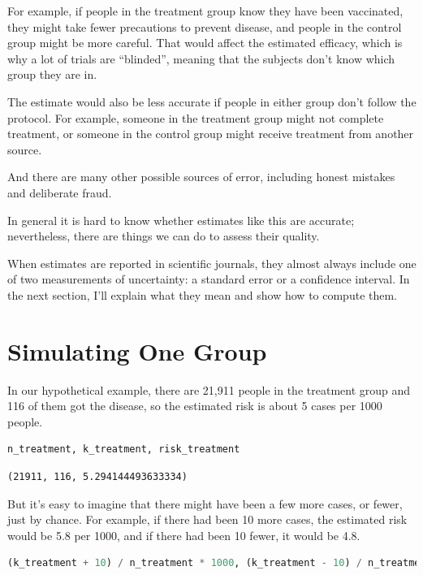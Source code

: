 For example, if people in the treatment group know they have been
vaccinated, they might take fewer precautions to prevent disease, and
people in the control group might be more careful. That would affect the
estimated efficacy, which is why a lot of trials are ``blinded'',
meaning that the subjects don't know which group they are in.

The estimate would also be less accurate if people in either group don't
follow the protocol. For example, someone in the treatment group might
not complete treatment, or someone in the control group might receive
treatment from another source.

And there are many other possible sources of error, including honest
mistakes and deliberate fraud.

In general it is hard to know whether estimates like this are accurate;
nevertheless, there are things we can do to assess their quality.

When estimates are reported in scientific journals, they almost always
include one of two measurements of uncertainty: a standard error or a
confidence interval. In the next section, I'll explain what they mean
and show how to compute them.

\hypertarget{simulating-one-group}{%
\section{Simulating One Group}\label{simulating-one-group}}

In our hypothetical example, there are 21,911 people in the treatment
group and 116 of them got the disease, so the estimated risk is about 5
cases per 1000 people.

\begin{lstlisting}[language=Python,style=source]
n_treatment, k_treatment, risk_treatment
\end{lstlisting}

\begin{lstlisting}[style=output]
(21911, 116, 5.294144493633334)
\end{lstlisting}

But it's easy to imagine that there might have been a few more cases, or
fewer, just by chance. For example, if there had been 10 more cases, the
estimated risk would be 5.8 per 1000, and if there had been 10 fewer, it
would be 4.8.

\begin{lstlisting}[language=Python,style=source]
(k_treatment + 10) / n_treatment * 1000, (k_treatment - 10) / n_treatment * 1000
\end{lstlisting}

